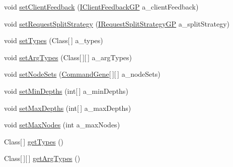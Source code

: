 \begin{DoxyCompactItemize}
\item 
void \hyperlink{classorg_1_1jgap_1_1distr_1_1grid_1_1gp_1_1_grid_configuration_g_p_base_ad0adda4a481e09c7d3f29b0934d434dd}{set\-Client\-Feedback} (\hyperlink{interfaceorg_1_1jgap_1_1distr_1_1grid_1_1gp_1_1_i_client_feedback_g_p}{I\-Client\-Feedback\-G\-P} a\-\_\-client\-Feedback)
\item 
void \hyperlink{classorg_1_1jgap_1_1distr_1_1grid_1_1gp_1_1_grid_configuration_g_p_base_ad45578cca8171d851d6811c1fa44d35e}{set\-Request\-Split\-Strategy} (\hyperlink{interfaceorg_1_1jgap_1_1distr_1_1grid_1_1gp_1_1_i_request_split_strategy_g_p}{I\-Request\-Split\-Strategy\-G\-P} a\-\_\-split\-Strategy)
\item 
void \hyperlink{classorg_1_1jgap_1_1distr_1_1grid_1_1gp_1_1_grid_configuration_g_p_base_a51a32e46a6804211d6d7b2c72ac425b0}{set\-Types} (Class\mbox{[}$\,$\mbox{]} a\-\_\-types)
\item 
void \hyperlink{classorg_1_1jgap_1_1distr_1_1grid_1_1gp_1_1_grid_configuration_g_p_base_ab3db49651e2ff5a9200f6f6a0473c733}{set\-Arg\-Types} (Class\mbox{[}$\,$\mbox{]}\mbox{[}$\,$\mbox{]} a\-\_\-arg\-Types)
\item 
void \hyperlink{classorg_1_1jgap_1_1distr_1_1grid_1_1gp_1_1_grid_configuration_g_p_base_a039ca834ef8b797cc16156dab21aa182}{set\-Node\-Sets} (\hyperlink{classorg_1_1jgap_1_1gp_1_1_command_gene}{Command\-Gene}\mbox{[}$\,$\mbox{]}\mbox{[}$\,$\mbox{]} a\-\_\-node\-Sets)
\item 
void \hyperlink{classorg_1_1jgap_1_1distr_1_1grid_1_1gp_1_1_grid_configuration_g_p_base_adef06f6111fe0a92703988e022ef3954}{set\-Min\-Depths} (int\mbox{[}$\,$\mbox{]} a\-\_\-min\-Depths)
\item 
void \hyperlink{classorg_1_1jgap_1_1distr_1_1grid_1_1gp_1_1_grid_configuration_g_p_base_af3bf71bfc8272f5da04c88ed2116e92e}{set\-Max\-Depths} (int\mbox{[}$\,$\mbox{]} a\-\_\-max\-Depths)
\item 
void \hyperlink{classorg_1_1jgap_1_1distr_1_1grid_1_1gp_1_1_grid_configuration_g_p_base_a2fc968669f9b75a16844076d5de32af6}{set\-Max\-Nodes} (int a\-\_\-max\-Nodes)
\item 
Class\mbox{[}$\,$\mbox{]} \hyperlink{classorg_1_1jgap_1_1distr_1_1grid_1_1gp_1_1_grid_configuration_g_p_base_a6d77a543f35b808ad461bd0e1272b05d}{get\-Types} ()
\item 
Class\mbox{[}$\,$\mbox{]}\mbox{[}$\,$\mbox{]} \hyperlink{classorg_1_1jgap_1_1distr_1_1grid_1_1gp_1_1_grid_configuration_g_p_base_a98904ab85d2b8a066fad96b4848438a5}{get\-Arg\-Types} ()
\item 

\end{DoxyCompactItemize}
